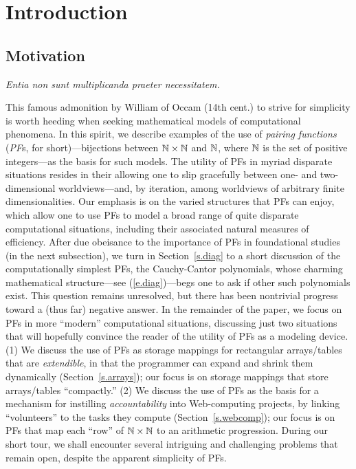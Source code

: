 \section{Introduction}

\setcounter{equation}{0}

\subsection{Motivation}

\begin{center}
{\it Entia non sunt multiplicanda praeter necessitatem.} \\
\end{center}

\noindent
This famous admonition by William of Occam (14th cent.) to strive for
simplicity is worth heeding when seeking mathematical models of
computational phenomena.  In this spirit, we describe examples of the
use of {\it pairing functions} ({\it PF}s, for short)---bijections
between $\mathbb{N} \times \mathbb{N}$ and $\mathbb{N}$, where $\mathbb{N}$ is the set of positive
integers---as the basis for such models.  The utility of PFs in myriad
disparate situations resides in their allowing one to slip gracefully
between one- and two-dimensional worldviews---and, by iteration, among
worldviews of arbitrary finite dimensionalities.  Our emphasis is on
the varied structures that PFs can enjoy, which allow one to use PFs
to model a broad range of quite disparate computational situations,
including their associated natural measures of efficiency.  After due
obeisance to the importance of PFs in foundational studies (in the
next subsection), we turn in Section~\ref{s.diag} to a short
discussion of the computationally simplest PFs, the Cauchy-Cantor
polynomials, whose charming mathematical structure---see
(\ref{e.diag})---begs one to ask if other such polynomials exist.
This question remains unresolved, but there has been nontrivial
progress toward a (thus far) negative answer.  In the remainder of the
paper, we focus on PFs in more ``modern'' computational situations,
discussing just two situations that will hopefully convince the reader
of the utility of PFs as a modeling device.  (1) We discuss the use of
PFs as storage mappings for rectangular arrays/tables that are {\it
extendible}, in that the programmer can expand and shrink them
dynamically (Section~\ref{s.arrays}); our focus is on storage mappings
that store arrays/tables ``compactly.''  (2) We discuss the use of PFs
as the basis for a mechanism for instilling {\em accountability} into
Web-computing projects, by linking ``volunteers'' to the tasks they
compute (Section~\ref{s.webcomp}); our focus is on PFs that map each
``row'' of $\mathbb{N} \times \mathbb{N}$ to an arithmetic progression.  During our
short tour, we shall encounter several intriguing and challenging
problems that remain open, despite the apparent simplicity of PFs.

